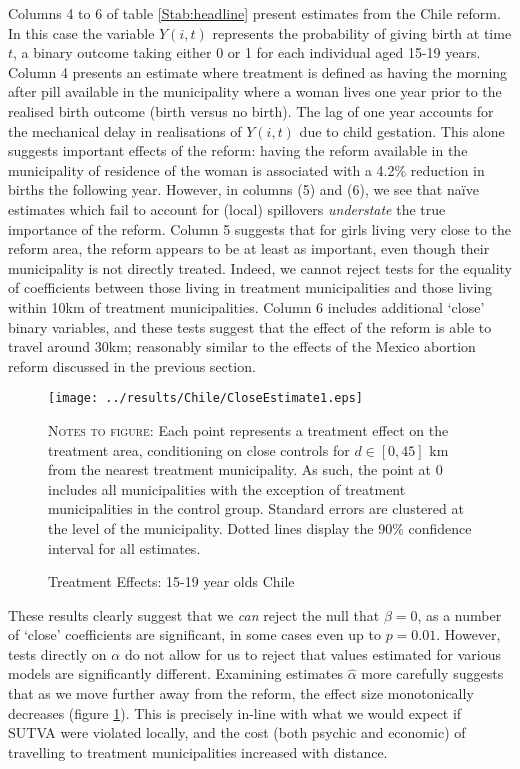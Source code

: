 \documentclass{article}
\begin{document}
\begin{spacing}{1.1}
Columns 4 to 6 of table \ref{Stab:headline} present estimates from the Chile
reform.  In this case the variable $Y(i,t)$ represents the probability of giving
birth at time $t$, a binary outcome taking either 0 or 1 for each individual aged 
15-19 years. Column 4 presents an estimate where treatment is defined as having
the morning after pill available in the municipality where a woman lives one
year prior to the realised birth outcome (birth versus no birth).  The lag of
one year accounts for the mechanical delay in realisations of $Y(i,t)$ due to 
child gestation.  This alone suggests important effects of the reform: having the
reform available in the municipality of residence of the woman is associated with
a 4.2\% reduction in births the following year.  However, in columns (5) and (6),
we see that na\"ive estimates which fail to account for (local) spillovers 
\emph{understate} the true importance of the reform.  Column 5 suggests that
for girls living very close to the reform area, the reform appears to be at least
as important, even though their municipality is not directly treated.  Indeed,
we cannot reject tests for the equality of coefficients between those living
in treatment municipalities and those living within 10km of treatment 
municipalities.  Column 6 includes additional `close' binary variables, and
these tests suggest that the effect of the reform is able to travel around 30km;
reasonably similar to the effects of the Mexico abortion reform discussed in 
the previous section.

\begin{figure}[htpb!]
\texttt{[image: ../results/Chile/CloseEstimate1.eps]}
\caption{Treatment Effects: 15-19 year olds Chile}
\label{Sfig:ChileAlpha}
\vspace{2mm}
\begin{footnotesize}
\textsc{Notes to figure}: Each point represents a treatment effect on the treatment
area, conditioning on close controls for $d\in [0,45]$ km from the nearest treatment 
municipality.  As such, the point at 0 includes all municipalities with the exception
of treatment municipalities in the control group.  Standard errors are clustered at 
the level of the municipality.  Dotted lines display the 90\% confidence interval for 
all estimates.
\end{footnotesize}
\end{figure}

These results clearly suggest that we \emph{can} reject the null that $\beta=0$, as
a number of `close' coefficients are significant, in some cases even up to $p=0.01$.
However, tests directly on $\alpha$ do not allow for us to reject that values 
estimated for various models are significantly different.  Examining estimates 
$\hat\alpha$ more carefully suggests that as we move further away from the reform,
the effect size monotonically decreases (figure \ref{Sfig:ChileAlpha}).  This is
precisely in-line with what we would expect if SUTVA were violated locally, and
the cost (both psychic and economic) of travelling to treatment municipalities
increased with distance.


\end{spacing}
\end{document}

